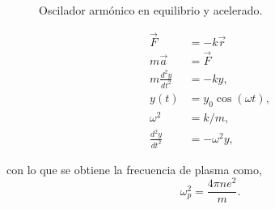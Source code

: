 \documentclass[12pt]{article}
\begin{document}
\begin{multicols}{2}
\begin{figure}[H]
\begin{tikzpicture}[x=0.9pt,y=0.9pt,yscale=-1,xscale=1]
\end{tikzpicture}
\label{OscArmonicoSimple}
\caption{Oscilador armónico en equilibrio y acelerado.}
\end{figure}

\begin{equation}
  \begin{split}
    \vec{F} &= -k\vec{r} \\
    m\vec{a}&=\vec{F} \\
    m\frac{d^{2}y}{dt^{2}}&=-ky,\\
    y(t)&=y_{0}\cos(\omega t),\\
    \omega^{2} &= k/m,\\
    \frac{d^{2}y}{dt^{2}}&=-\omega^{2} y,
    \label{OAEq}
  \end{split}
\end{equation} 

\end{multicols}

con lo que se obtiene la frecuencia de plasma como,
\begin{equation}
  \label{plasmafec}
  \omega _{p}^{2} = \frac{4\pi ne^{2}}{m}.
\end{equation}
\end{document}

